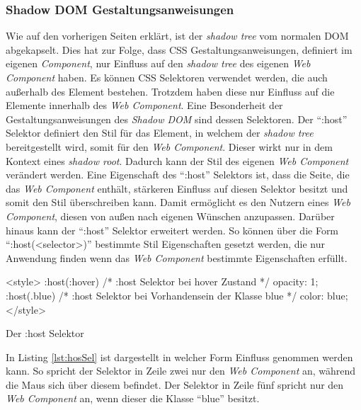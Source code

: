 \documentclass[12pt, paper=a4, bibtotoc, toc=listof, headsepline=true, numbers=endperiod]{scrreprt}
\begin{document}
		\subsubsection{Shadow DOM Gestaltungsanweisungen}
		Wie auf den vorherigen Seiten erklärt, ist der \emph{shadow tree} vom normalen \ac{DOM} abgekapselt. Dies hat zur Folge, dass \ac{CSS} Gestaltungsanweisungen, definiert im eigenen \emph{Component}, nur Einfluss auf den \emph{shadow tree} des eigenen \emph{Web Component} haben. Es können \ac{CSS} Selektoren verwendet werden, die auch außerhalb des Element bestehen. Trotzdem haben diese nur Einfluss auf die Elemente innerhalb des \emph{Web Component}.  
		 \newline
		Eine Besonderheit der Gestaltungsanweisungen des \emph{Shadow DOM} sind dessen Selektoren. Der \enquote{:host} Selektor definiert den Stil für das Element, in welchem der \emph{shadow tree} bereitgestellt wird, somit für den \emph{Web Component}. Dieser wirkt nur in dem Kontext eines \emph{shadow root}. Dadurch kann der Stil des eigenen \emph{Web Component} verändert werden. Eine Eigenschaft des \enquote{:host} Selektors ist, dass die Seite, die das \emph{Web Component} enthält, stärkeren Einfluss auf diesen Selektor besitzt und somit den Stil überschreiben kann. Damit ermöglicht es den Nutzern eines \emph{Web Component}, diesen von außen nach eigenen Wünschen anzupassen. Darüber hinaus kann der \enquote{:host} Selektor erweitert werden. So können über die Form \enquote{:host(<selector>)} bestimmte Stil Eigenschaften gesetzt werden, die nur Anwendung finden wenn das \emph{Web Component} bestimmte Eigenschaften erfüllt. 
		\begin{listing}
		\begin{HTMLcode*}{}
<style>		
:host(:hover) { /* :host Selektor bei hover Zustand */
   opacity: 1;
}
:host(.blue) { /* :host Selektor bei Vorhandensein der Klasse blue */
   color: blue;
}
</style>
		\end{HTMLcode*}
		\caption{Der :host Selektor}
		\label{lst:hosSel}
		\end{listing}
		In Listing \ref{lst:hosSel} ist dargestellt in welcher Form Einfluss genommen werden kann. So spricht der Selektor in Zeile zwei nur den \emph{Web Component} an, während die Maus sich über diesem befindet. Der Selektor in Zeile fünf spricht nur den \emph{Web Component} an, wenn dieser die Klasse \enquote{blue} besitzt.
\end{document}
